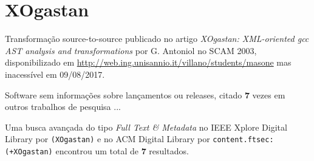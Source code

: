 \section{XOgastan}

Transformação source-to-source
publicado no artigo {\it XOgastan: XML-oriented gcc AST analysis and transformations}
por G. Antoniol
no SCAM 2003,
disponibilizado em \url{http://web.ing.unisannio.it/villano/students/masone}
mas inacessível em 09/08/2017.

Software sem informações sobre lançamentos ou releases,
citado {\bf 7} vezes em outros trabalhos de pesquisa ...

Uma busca avançada do tipo {\it Full Text \& Metadata} no IEEE Xplore Digital Library por
\texttt{(XOgastan)}
e no ACM Digital Library por
\texttt{content.ftsec:(+XOgastan)}
encontrou um total de
{\bf 7}
resultados.


